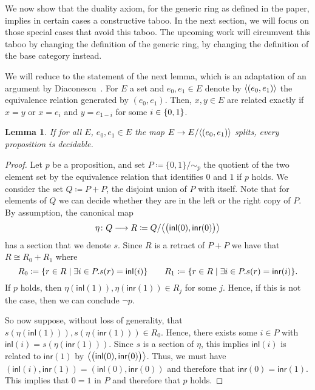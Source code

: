 \documentclass[10pt,a4paper]{article}
\newtheorem{lemma}{Lemma}[section]
\newcommand\inl{\mathsf{inl}}
\newcommand\inr{\mathsf{inr}}
\DeclarePairedDelimiter\gen{\langle}{\rangle}
\DeclarePairedDelimiter\paren{(}{)}
\DeclarePairedDelimiter\set{\{}{\}}
\begin{document}
We now show that the duality axiom, for the generic ring as defined in the paper, implies in certain cases a constructive taboo.
In the next section, we will focus on those special cases that avoid this taboo.
The upcoming work will circumvent this taboo by changing the definition of the generic ring, by changing the definition of the base category instead.

We will reduce to the statement of the next lemma, which is an adaptation of an argument by Diaconescu~\cite{diaconescu1975choice}.
For $E$ a set and $e_0, e_1 \in E$ denote by $\gen{(e_0, e_1)}$ the equivalence relation generated by $(e_0, e_1)$.
Then, $x, y \in E$ are related exactly if $x = y$ or $x = e_i$ and $y = e_{1-i}$ for some $i \in \set{0,1}$.

\begin{lemma}\label{prop:coequalizers-of-disjoint-subobjects-with-terminal-doamin-split-implies-lem}
  If for all $E$, $e_0, e_1 \in E$ the map $E \to E/\gen{(e_0, e _1)}$ splits, every proposition is decidable.
\end{lemma}
\begin{proof}
  Let $p$ be a proposition, and set $P \coloneqq \{ 0, 1 \} / \sim_p$ the quotient of the two element set by the equivalence relation that identifies $0$ and $1$ if $p$ holds.
  We consider the set $Q \coloneqq P + P$, the disjoint union of $P$ with itself.
  Note that for elements of $Q$ we can decide whether they are in the left or the right copy of $P$.
  By assumption, the canonical map
  \[
    \eta \colon Q \longrightarrow R \coloneqq Q / \gen[\big]{\paren[\big]{ \inl(0), \inr(0) }}
  \]
  has a section that we denote $s$.
  Since $R$ is a retract of $P + P$ we have that $R \cong R_0 + R_1$ where
  \[
    R_0 \coloneqq \set{ r \in R \mid \exists i \in P. s(r) = \inl(i) } \qquad
    R_1 \coloneqq \set{ r \in R \mid \exists i \in P. s(r) = \inr(i) }.
  \]
  If $p$ holds, then $\eta(\inl(1)), \eta(\inr(1)) \in R_j$ for some $j$.
  Hence, if this is not the case, then we can conclude $\neg p$.

  So now suppose, without loss of generality, that $s(\eta(\inl(1))), s(\eta(\inr(1))) \in R_0$.
  Hence, there exists some $i \in P$ with $\inl(i) = s(\eta(\inr(1)))$.
  Since $s$ is a section of $\eta$, this implies $\inl(i)$ is related to $\inr(1)$ by $\gen[\big]{\paren[\big]{ \inl(0), \inr(0) }}$.
  Thus, we must have $(\inl(i), \inr(1)) = (\inl(0), \inr(0))$ and therefore that $\inr(0) = \inr(1)$.
  This implies that $0 = 1$ in $P$ and therefore that $p$ holds.
\end{proof}
\end{document}

